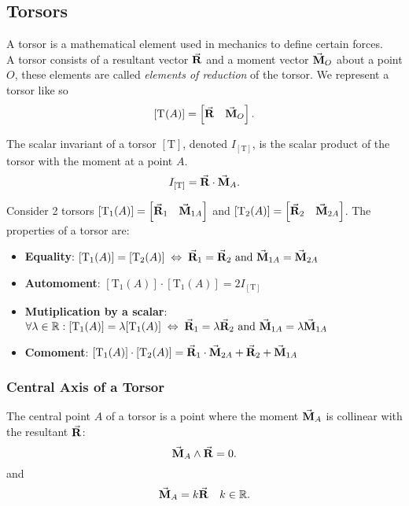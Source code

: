 \documentclass[a4paper,12pt]{article}
\newcommand{\tor}[2]{[\mathrm{T}_{#1}(#2)]}
\newcommand{\torc}[2]{\left[ #1 \quad #2 \right] }
\newcommand{\T}{{[\mathrm{T}]}}
\begin{document}
\subsection{Torsors}
A torsor is a mathematical element used in mechanics to define certain forces.\\

A torsor consists of a resultant vector $\va{R}$ and a moment vector $\va{M}_O$ about a point $O$, these elements are called \emph{elements of reduction} of the torsor. We represent a torsor like so
\[
	\tor{}{A}=\torc{\va{R}}{\va{M}_O}
	.\]

\begin{definition}
	The scalar invariant of a torsor $\T$, denoted  $I_\T$, is the scalar product of the torsor with the moment at a point $A$.
	\[
		I_\T = \va{R}\cdot \va{M}_A
		.\]
\end{definition}
Consider 2 torsors $\tor{1}{A} = \torc{\va{R}_1}{\va{M}_{1A}}$ and  $\tor{2}{A} = \torc{\va{R}_2}{\va{M}_{2A}}$. The properties of a torsor are:

\begin{itemize}
	\item \textbf{Equality}: $\tor{1}{A}=\tor{2}{A} \; \Leftrightarrow \; \va{R}_1 = \va{R}_2 \text{ and } \va{M}_{1A}=\va{M}_{2A}$\vspace{0.5em}
	\item \textbf{Automoment}: $\tor{1}{A}\cdot \tor{1}{A} = 2 I_\T$\vspace{0.5em}
	\item \textbf{Mutiplication by a scalar}: $\forall \lambda\in\mathbb{R}: \tor{1}{A}=\lambda\tor{1}{A}\;\Leftrightarrow\; \va{R}_1=\lambda\va{R}_2\text{ and } \va{M}_{1A}=\lambda\va{M}_{1A}$\vspace{0.5em}
	\item \textbf{Comoment}: $\tor{1}{A}\cdot \tor{2}{A} = \va{R}_1\cdot \va{M}_{2A}+\va{R}_2+\va{M}_{1A}$\vspace{0.5em}
\end{itemize}
\subsubsection{Central Axis of a Torsor}

\begin{definition}
	The central point $A$ of a torsor is a point where the moment $\va{M}_A$ is collinear with the resultant $\va{R}$:
	\[
		\va{M}_A\land\va{R}=0
		.\]
	and
	\[
		\va{M}_A=k\va{R} \quad k\in \mathbb{R}
		.\]
\end{definition}
\end{document}
